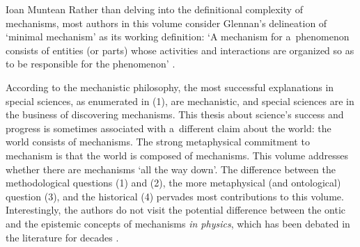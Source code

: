 \begin{recengenv}{Ioan Muntean}
Rather than delving into the definitional complexity of mechanisms, most authors in this volume consider Glennan's delineation of ‘minimal mechanism' as its working definition: ‘A mechanism for a~phenomenon consists of entities (or parts) whose activities and interactions are organized so as to be responsible for the phenomenon'
\parencite[][p.17]{illari_routledge_2017}.%


According to the mechanistic philosophy, the most successful explanations in special sciences, as enumerated in (1), are mechanistic, and special sciences are in the business of discovering mechanisms. This thesis about science's success and progress is sometimes associated with a~different claim about the world: the world consists of mechanisms. The strong metaphysical commitment to mechanism is that the world is composed of mechanisms. This volume addresses whether there are mechanisms ‘all the way down'. The difference between the methodological questions (1) and (2), the more metaphysical (and ontological) question (3), and the historical (4) pervades most contributions to this volume. Interestingly, the authors do not visit the potential difference between the ontic and the epistemic concepts of mechanisms \textit{in physics}, which has been debated in the literature for decades
\parencites{salmon_scientific_1984}{glennan_rethinking_2002}{wright_mechanistic_2012}{illari_mechanistic_2013}.


\end{recengenv}
